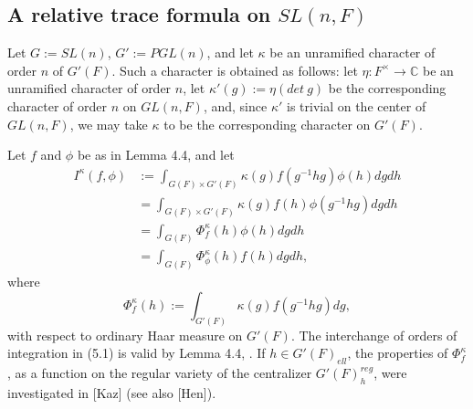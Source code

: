 \documentclass[12pt]{article}
\begin{document}
\subsection{A relative trace formula on $SL(n,F)$}

Let $G:=SL(n)$, $G':=PGL(n)$, and let $\kappa$ be an unramified character of order $n$ of $G'(F)$. Such a character is obtained as follows: let $\eta:F^\times\rightarrow\mathbb{C}$ be an unramified character of order $n$, let $\kappa'(g):=\eta(det\ g)$ be the corresponding character of order $n$ on $GL(n,F)$, and, since $\kappa'$ is trivial on the center of $GL(n,F)$, we may take $\kappa$ to be the corresponding character on $G'(F)$.

Let $f$ and $\phi$ be as in Lemma 4.4, and let
\begin{equation}\tag{5.1}
\begin{array}{rl}
I^\kappa(f,\phi)&:=\int_{G(F)\times G'(F)}\kappa(g)f(g^{-1}hg)\phi(h)dgdh\\
&=\int_{G(F)\times G'(F)}\kappa(g)f(h)\phi(g^{-1}hg)dgdh\\
&=\int_{G(F)}\Phi^\kappa_f(h)\phi(h)dgdh\\
&=\int_{G(F)}\Phi^\kappa_\phi(h)f(h)dgdh,
\end{array}
\end{equation}
where
\[
\Phi^\kappa_f(h):=\int_{G'(F)}\kappa(g)f(g^{-1}hg)dg,
\]
with respect to ordinary Haar measure on $G'(F)$. The interchange of orders of integration in (5.1) is valid by Lemma 4.4, . If $h\in G'(F)_{ell}$, the properties of $\Phi^\kappa_f$, as a function on the regular variety of the centralizer $G'(F)_h^{reg}$, were investigated in [Kaz] (see also [Hen]).
\end{document}
